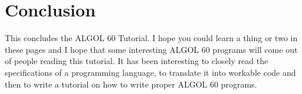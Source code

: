 \documentclass{article}
\begin{document}
\section{Conclusion}
This concludes the ALGOL 60 Tutorial. I hope you could learn a thing or two in these pages and I hope that some interesting ALGOL 60 programs will come out of people reading this tutorial. It has been interesting to closely read the specifications of a programming language, to translate it into workable code and then to write a tutorial on how to write proper ALGOL 60 programs.
\end{document}

